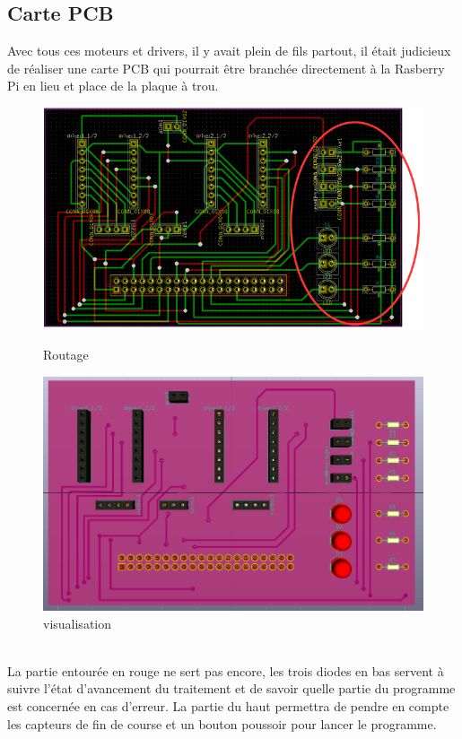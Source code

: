 \documentclass[12pt]{article}
\begin{document}
\subsection{Carte PCB}
Avec tous ces moteurs et drivers, il y avait plein de fils partout, il était judicieux de réaliser une carte PCB qui pourrait être branchée directement à la Rasberry Pi en lieu et place de la plaque à trou.
\begin{figure}[!h]
\centering
\begin{minipage}{.5\textwidth}
  \centering
  \includegraphics[scale = 0.4]{pcb.png}
  \caption{\label{e4} Routage}
\end{minipage}%
\begin{minipage}{.5\textwidth}
  \centering
  \includegraphics[scale = 0.22]{k2.png}
  \caption{\label{e5} visualisation}
\end{minipage}
\end{figure}\\
La partie entourée en rouge ne sert pas encore, les trois diodes en bas servent à suivre l'état d'avancement du traitement et de savoir quelle partie du programme est concernée en cas d'erreur. La partie du haut permettra de pendre en compte les capteurs de fin de course et  un bouton poussoir pour lancer le programme.
\end{document}
